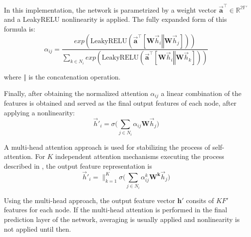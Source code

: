 In this implementation, the network is parametrized by a weight vector
$\bm{\vec{a}}^\intercal \in \mathbb{R^{2F'}}$ and a LeakyRELU nonlinearity is applied.
The fully expanded form of this formula is:
\begin{equation}
  \label{eq:full_gan}
  \alpha_{ij}=
  \frac{exp(\text{LeakyRELU}(\bm{\vec{a}}^\intercal[\bm{W}\vec{h}_i\mathbin\Vert\bm{W}\vec{h}_j]))}
  {\sum_{k\in
N_i}
exp(\text{LeakyRELU}(\bm{\vec{a}}^\intercal[\bm{W}\vec{h}_i\mathbin\Vert\bm{W}\vec{h}_k]))}
\end{equation}

where $\mathbin\Vert$ is the concatenation operation.

Finally, after obtaining the normalized attention $\alpha_{ij}$ a linear
combination of the features is obtained and served as the final output
features of each node, after applying a nonlinearity:
\begin{equation}
  \label{eq:final_feature}
  \vec{h}'_i = \sigma \big( \sum_{j\in N_i} \alpha_{ij}\bm{W} \vec{h}_j\big)
\end{equation}

A multi-head attention approach is used for stabilizing the process of self-attention.
For $K$ independent attention mechanisms executing the process described in , the output feature representation is
\begin{equation}
  \label{eq:final_mult}
  \vec{h}'_i = \Big\|^K_{k=1}\sigma\Big( \sum_{j\in N_i}\alpha_{ij}^k \bm{W^k}\vec{h}_j\Big)
\end{equation}

Using the multi-head approach, the output feature vector $\bm{h}'$ consits of
$KF'$ features for each node. If the multi-head attention is performed in the
final prediction layer of the network, averaging is usually applied and nonlinearity
is not applied until then.